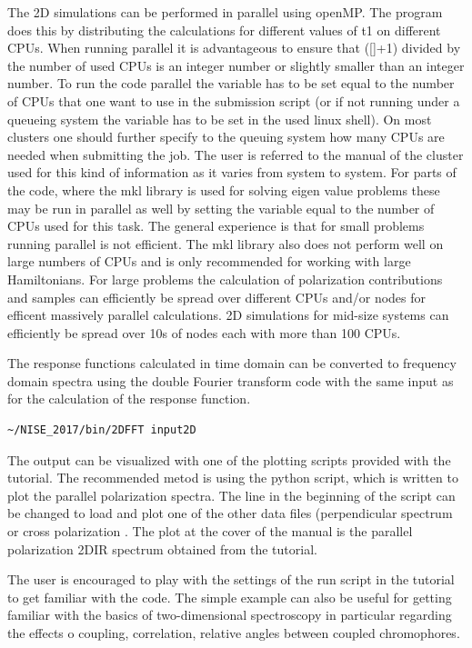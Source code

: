 The 2D simulations can be performed in parallel using openMP. The program does this by
distributing the calculations for different values of t1 on different CPUs. When
running parallel it is advantageous to ensure that ([]+1) divided by the
number of used CPUs is an integer number or slightly smaller than an integer number.
To run the code parallel the  variable has to be set equal to
the number of CPUs that one want to use in the submission script (or if not running
under a queueing system the variable has to be set in the used linux shell). On most
clusters one should further specify to the queuing system how many CPUs are needed
when submitting the job. The user is referred to the manual of the cluster used for
this kind of information as it varies from system to system. For parts of the code,
where the mkl library is used for solving eigen value problems these may be run in
parallel as well by setting the  variable equal to the number
of CPUs used for this task. The general experience is that for small problems running
parallel is not efficient. The mkl library also does not perform well on large numbers
of CPUs and is only recommended for working with large Hamiltonians.  For large
problems the calculation of polarization contributions and samples can efficiently be
spread over different CPUs and/or nodes for efficent massively parallel calculations.
2D simulations for mid-size systems can efficiently be spread over 10s of nodes each
with more than 100 CPUs.

The response functions calculated in time domain can be converted to frequency domain
spectra using the double Fourier transform code with the same input as for the
calculation of the response function.
\begin{lstlisting}[style=mystyle]
~/NISE_2017/bin/2DFFT input2D
\end{lstlisting}
The output can be visualized with one of the plotting scripts provided with the
tutorial. The recommended metod is using the  python script, which is
written to plot the parallel polarization spectra. The line
 in the beginning of the script can be changed to
load and plot one of the other data files (perpendicular spectrum  or
cross polarization . The plot at the cover of the manual is the
parallel polarization 2DIR spectrum obtained from the tutorial.

The user is encouraged to play with the settings of the run script in the tutorial to
get familiar with the code. The simple example can also be useful for getting familiar
with the basics of two-dimensional spectroscopy in particular regarding the effects o
coupling, correlation, relative angles between coupled chromophores.

